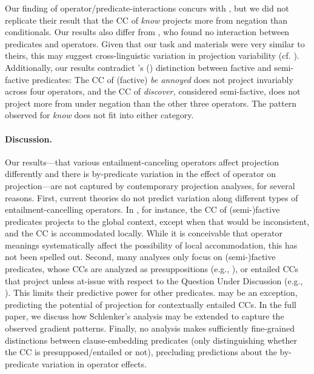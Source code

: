\documentclass[11pt, a4paper]{article}
\newcommand{\posscite}[1]{\citeauthor{#1}'s (\citeyear{#1})}
\begin{document}
	Our finding of operator/predicate-interactions concurs with \citet{smith_projection_2011}, but we did not replicate their result that the CC of \emph{know} projects more from negation than conditionals.
	Our results also differ from \citet{sieker_projective_2022}, who found no interaction between predicates and operators. Given that our task and materials were very similar to theirs, this may suggest cross-linguistic variation in projection variability (cf. \citealt{tonhauser_projection_2020}).
	Additionally, our results contradict \posscite{karttunen_observations_1971} distinction between factive and semi-factive predicates: The CC of (factive) \emph{be annoyed} does not project invariably across four operators, and the CC of \emph{discover,}  considered semi-factive, does not project more from under negation than the other three operators. The pattern observed for {\em know} does not fit into either category.
	
	
\paragraph{Discussion.}
	Our results---that various entailment-canceling operators affect projection differently and there is by-predicate variation in the effect of operator on projection---are not captured by contemporary projection analyses, for several reasons.
	First, current theories do not predict variation along different types of entailment-cancelling operators. In \citet{heim_projection_1983}, for instance, the CC of (semi-)factive predicates projects to the global context, except when that would be inconsistent, and the CC is accommodated locally. While it is conceivable that operator meanings systematically affect the possibility of local accommodation, this has not been spelled out.
	Second, many analyses only focus on (semi-)factive predicates, whose CCs are analyzed as presuppositions (e.g., \citealt{heim_projection_1983,van_der_sandt_presupposition_1992}), or entailed CCs that project unless at-issue with respect to the Question Under Discussion (e.g., \citealt{abrusan_predicting_2011,simons_best_2017}). This limits their predictive power for other predicates.
	\citet{schlenker_triggering_2021} may be an exception, predicting the potential of projection for contextually entailed CCs. In the full paper, we discuss how Schlenker's analysis may be extended to capture the observed gradient patterns.
	Finally, no analysis makes sufficiently fine-grained distinctions between clause-embedding predicates (only distinguishing whether the CC is presupposed/entailed or not), precluding predictions about the by-predicate variation in operator effects.
\end{document}
